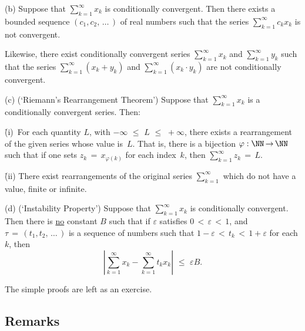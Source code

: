 \V

        (b) Suppose that $\sum_{k=1}^{{\infty}} x_{k}$ is conditionally convergent.
    Then there exists a bounded sequence $(c_{1},c_{2},\,{\ldots}\,)$ of real numbers such that the series $\sum_{k=1}^{{\infty}} c_{k}x_{k}$ is not convergent.

        Likewise, there exist conditionally convergent series $\sum_{k=1}^{{\infty}} x_{k}$ and $\sum_{k=1}^{{\infty}} y_{k}$ such that
    the series $\sum_{k=1}^{{\infty}} (x_{k} + y_{k})$ and $\sum_{k=1}^{{\infty}} (x_{k} {\cdot} y_{k})$ are not conditionally convergent.

\V

        (c) (`Riemann's Rearrangement Theorem') Suppose that $\sum_{k=1}^{{\infty}} x_{k}$ is a conditionally convergent series.
    Then:

        \h (i)\, For each quantity $L$, with $-{\infty}\,\,{\leq}\,\,L\,\,{\leq}\,\,+{\infty}$, there exists a rearrangement of the given series whose value is~$L$.
    That is, there is a bijection ${\varphi}:{\NN} \,{\rightarrow}\, {\NN}$ such that if one sets $z_{k} \,=\, x_{{\varphi}(k)}$ for each index~$k$, then $\sum_{k=1}^{{\infty}} z_{k} \,=\, L$.

        \h (ii) There exist rearrangements of the original series $\sum_{k=1}^{{\infty}}$ which do not have a value, finite or infinite.



\V

        (d) (`Instability Property') Suppose that $\sum_{k=1}^{{\infty}} x_{k}$ is conditionally convergent.
    Then there is \underline{no} constant $B$ such that if ${\varepsilon}$ satisfies $0\,<\,{\varepsilon}\,<\,1$,
    and ${\tau} \,=\, (t_{1},t_{2},\,{\ldots}\,)$ is a sequence of numbers such that $1-{\varepsilon}\,<\,t_{k}\,<\,1+{\varepsilon}$ for each $k$,
    then
        \begin{displaymath}
        \left|\sum_{k=1}^{{\infty}} x_{k} - \sum_{k=1}^{{\infty}} t_{k}x_{k}\right|\,\,{\leq}\,\,{\varepsilon}B.
        \end{displaymath}

\V

        The simple proofs are left as an exercise.

\V
\V

        \subsection{\small{{\bf Remarks}}}
        \label{RemrkG40.70}

